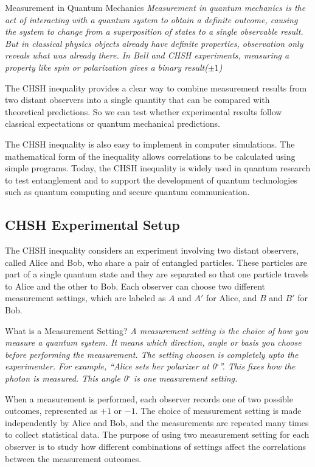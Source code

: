 \documentclass[17pt,a4paper]{extarticle}
\begin{document}
\begin{conceptbox}{Measurement in Quantum Mechanics}
\textit{Measurement in quantum mechanics is the act of interacting with a quantum system to obtain a definite outcome, causing the system to change from a superposition of states to a single observable result. But in classical physics objects already have definite properties, observation only reveals what was already there. In Bell and CHSH experiments, measuring a property like spin or polarization gives a binary result($\pm1$)}
\end{conceptbox}

The CHSH inequality provides a clear way to combine measurement results from two distant observers into a single quantity that can be compared with theoretical predictions. So we can test whether experimental results follow classical expectations or quantum mechanical predictions.

The CHSH inequality is also easy to implement in computer simulations. The mathematical form of the inequality allows correlations to be calculated using simple programs. Today, the CHSH inequality is widely used in quantum research to test entanglement and to support the development of quantum technologies such as quantum computing and secure quantum communication.

\subsection{CHSH Experimental Setup}
The CHSH inequality considers an experiment involving two distant observers, called Alice and Bob, who share a pair of entangled particles. These particles are part of a single quantum state and they are separated so that one particle travels to Alice and the other to Bob. Each observer can choose two different measurement settings, which are labeled as $A$ and $A'$ for Alice, and $B$ and $B'$ for Bob.

\begin{conceptbox}{What is a Measurement Setting?}
\textit{A measurement setting is the choice of how you measure a quantum system. It means which direction, angle or basis you choose before performing the measurement. The setting choosen is completely upto the experimenter. For example, ``Alice sets her polarizer at 0$^\circ$''. This fixes how the photon is measured. This angle 0$^\circ$ is one measurement setting.}
\end{conceptbox}

When a measurement is performed, each observer records one of two possible outcomes, represented as $+1$ or $-1$. The choice of measurement setting is made independently by Alice and Bob, and the measurements are repeated many times to collect statistical data. The purpose of using two measurement setting for each observer is to study how different combinations of settings affect the correlations between the measurement outcomes.
\end{document}
